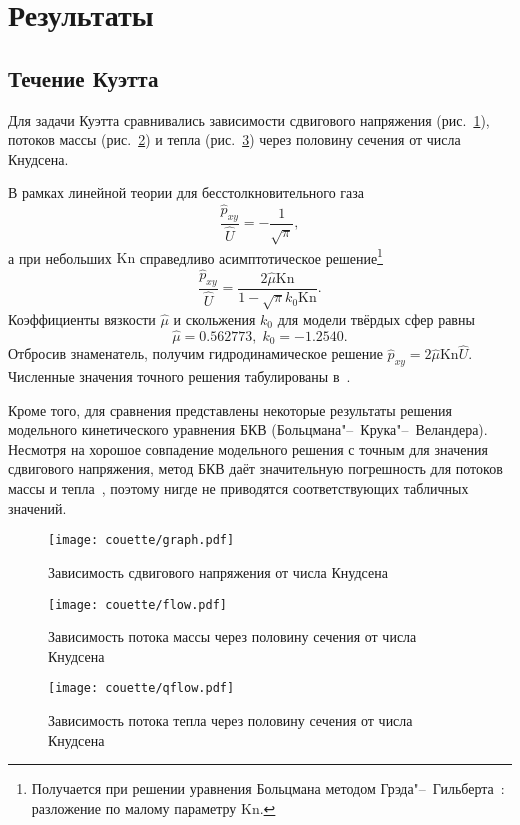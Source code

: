 \documentclass[a4paper,12pt]{article}
\newcommand{\Kn}{\mathrm{Kn}}
\begin{document}
\section{Результаты}

\subsection{Течение Куэтта}

Для задачи Куэтта сравнивались зависимости сдвигового напряжения (рис.~\ref{fig:couette:shear}),
потоков массы (рис.~\ref{fig:couette:flow}) и тепла (рис.~\ref{fig:couette:qflow})
через половину сечения от числа Кнудсена.

В рамках линейной теории для бесстолкновительного газа
\[ \frac{\hat{p}_{xy}}{\hat{U}} = -\frac1{\sqrt{\pi}}, \]
а при небольших \(\Kn\) справедливо асимптотическое решение\footnote
{ Получается при решении уравнения Больцмана методом Грэда"--~Гильберта~\cite{Sone2007}: разложение по малому параметру \(\Kn\). }
\[ \frac{\hat{p}_{xy}}{\hat{U}} = \frac{2\hat{\mu}\Kn}{1-\sqrt{\pi}k_0\Kn}. \]
Коэффициенты вязкости \(\hat{\mu}\) и скольжения \(k_0\) для модели твёрдых сфер равны~\cite{Sone2007}
\[ \hat{\mu} = 0.562773, \; k_0 = -1.2540. \]
Отбросив знаменатель, получим гидродинамическое решение \(\hat{p}_{xy} = 2\hat{\mu}\Kn\hat{U}\).
Численные значения точного решения табулированы в~\cite{Sone1990}.

Кроме того, для сравнения представлены некоторые результаты 
решения модельного кинетического уравнения БКВ (Больцмана"--~Крука"--~Веландера).
Несмотря на хорошое совпадение модельного решения с точным для значения сдвигового напряжения,
метод БКВ даёт значительную погрешность для потоков массы и тепла~\cite{Sone1990},
поэтому нигде не приводятся соответствующих табличных значений.

\begin{figure}
	\centering
	\texttt{[image: couette/graph.pdf]}
	\caption{Зависимость сдвигового напряжения от числа Кнудсена}\label{fig:couette:shear}
\end{figure}

\begin{figure}
	\centering
	\texttt{[image: couette/flow.pdf]}
	\caption{Зависимость потока массы через половину сечения от числа Кнудсена}\label{fig:couette:flow}
\end{figure}

\begin{figure}
	\centering
	\texttt{[image: couette/qflow.pdf]}
	\caption{Зависимость потока тепла через половину сечения от числа Кнудсена}\label{fig:couette:qflow}
\end{figure}
\end{document}
